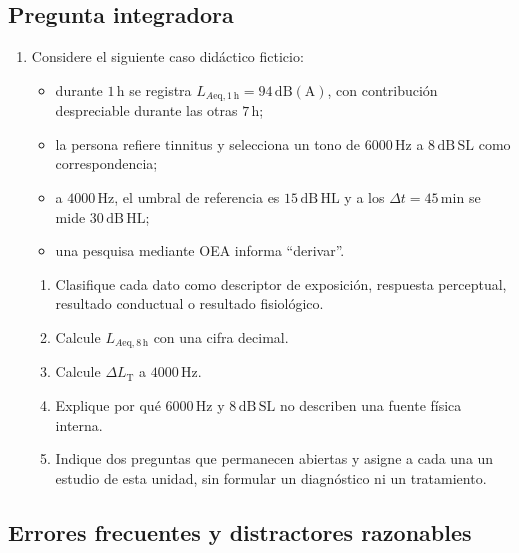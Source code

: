 \subsection*{Pregunta integradora}

\begin{enumerate}[label=\textbf{INT\arabic*.},leftmargin=*]
    \item Considere el siguiente caso didáctico ficticio:
    \begin{itemize}
        \item durante \(1\,\mathrm{h}\) se registra
        \(L_{A\mathrm{eq},1\,\mathrm{h}}=94\,\mathrm{dB(A)}\), con contribución
        despreciable durante las otras \(7\,\mathrm{h}\);
        \item la persona refiere tinnitus y selecciona un tono de
        \(6000\,\mathrm{Hz}\) a \(8\,\mathrm{dB\,SL}\) como correspondencia;
        \item a \(4000\,\mathrm{Hz}\), el umbral de referencia es
        \(15\,\mathrm{dB\,HL}\) y a los \(\Delta t=45\,\mathrm{min}\) se mide
        \(30\,\mathrm{dB\,HL}\);
        \item una pesquisa mediante OEA informa ``derivar''.
    \end{itemize}
    \begin{enumerate}
        \item Clasifique cada dato como descriptor de exposición, respuesta
        perceptual, resultado conductual o resultado fisiológico.
        \item Calcule \(L_{A\mathrm{eq},8\,\mathrm{h}}\) con una cifra decimal.
        \item Calcule \(\Delta L_{\mathrm{T}}\) a \(4000\,\mathrm{Hz}\).
        \item Explique por qué \(6000\,\mathrm{Hz}\) y
        \(8\,\mathrm{dB\,SL}\) no describen una fuente física interna.
        \item Indique dos preguntas que permanecen abiertas y asigne a cada una
        un estudio de esta unidad, sin formular un diagnóstico ni un
        tratamiento.
    \end{enumerate}
\end{enumerate}

\subsection*{Errores frecuentes y distractores razonables}

